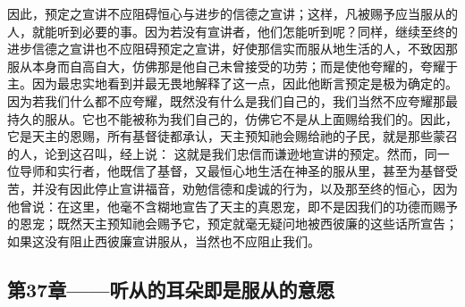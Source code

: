 因此，预定之宣讲不应阻碍恒心与进步的信德之宣讲；这样，凡被赐予应当服从的人，就能听到必要的事。因为若没有宣讲者，他们怎能听到呢？同样，继续至终的进步信德之宣讲也不应阻碍预定之宣讲，好使那信实而服从地生活的人，不致因那服从本身而自高自大，仿佛那是他自己未曾接受的功劳；而是使他夸耀的，夸耀于主。因为最忠实地看到并最无畏地解释了这一点，因此他断言预定是极为确定的。因为若我们什么都不应夸耀，既然没有什么是我们自己的，我们当然不应夸耀那最持久的服从。它也不能被称为我们自己的，仿佛它不是从上面赐给我们的。因此，它是天主的恩赐，所有基督徒都承认，天主预知祂会赐给祂的子民，就是那些蒙召的人，论到这召叫，经上说： 这就是我们忠信而谦逊地宣讲的预定。然而，同一位导师和实行者，他既信了基督，又最恒心地生活在神圣的服从里，甚至为基督受苦，并没有因此停止宣讲福音，劝勉信德和虔诚的行为，以及那至终的恒心，因为他曾说：在这里，他毫不含糊地宣告了天主的真恩宠，即不是因我们的功德而赐予的恩宠；既然天主预知祂会赐予它，预定就毫无疑问地被西彼廉的这些话所宣告；如果这没有阻止西彼廉宣讲服从，当然也不应阻止我们。\par


\subsection{第37章——听从的耳朵即是服从的意愿}

